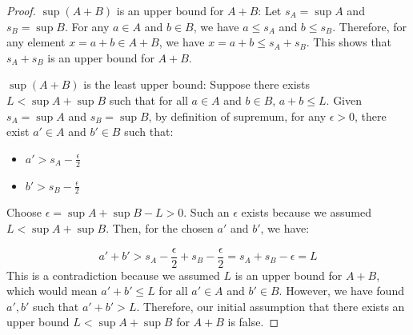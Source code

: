 \documentclass[10pt]{article}
\newenvironment{problem}[2][Problem]{\begin{trivlist}
\item[\hskip \labelsep {\bfseries #1}\hskip \labelsep {\bfseries #2.}]}{\end{trivlist}}
\begin{document}
\begin{problem}{3}
\begin{enumerate}
\begin{proof}
                    $\sup(A+B)$ is an upper bound for $A+B$: Let $s_A = \sup A$ and $s_B = \sup B$. For any $a \in A$ and $b \in B$, we have $a \leq s_A$ and $b \leq s_B$. Therefore, for any element $x = a + b \in A+B$, we have $x = a + b \leq s_A + s_B$. This shows that $s_A + s_B$ is an upper bound for $A+B$.

                    $\sup(A+B)$ is the least upper bound: Suppose there exists $L < \sup A + \sup B$ such that for all $a \in A$ and $b \in B$, $a + b \leq L$. Given $s_A = \sup A$ and $s_B = \sup B$, by definition of supremum, for any $\epsilon > 0$, there exist $a' \in A$ and $b' \in B$ such that:

\begin{itemize}
    \item $a' > s_A - \frac{\epsilon}{2}$
    \item $b' > s_B - \frac{\epsilon}{2}$
\end{itemize}

Choose $\epsilon = \sup A + \sup B - L > 0$. Such an $\epsilon$ exists because we assumed $L < \sup A + \sup B$. Then, for the chosen $a'$ and $b'$, we have:

$$a' + b' > s_A - \frac{\epsilon}{2} + s_B - \frac{\epsilon}{2} = s_A + s_B - \epsilon = L$$
This is a contradiction because we assumed $L$ is an upper bound for $A+B$, which would mean $a' + b' \leq L$ for all $a' \in A$ and $b' \in B$. However, we have found $a', b'$ such that $a' + b' > L$. Therefore, our initial assumption that there exists an upper bound $L < \sup A + \sup B$ for $A+B$ is false.
                \end{proof}
	\end{enumerate}
\end{problem}

\newpage
\end{document}
